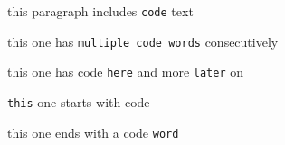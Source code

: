 this paragraph includes \verb|code| text

this one has \verb|multiple code words| consecutively

this one has code \verb|here| and more \verb|later| on

\verb|this| one starts with code

this one ends with a code \verb|word|